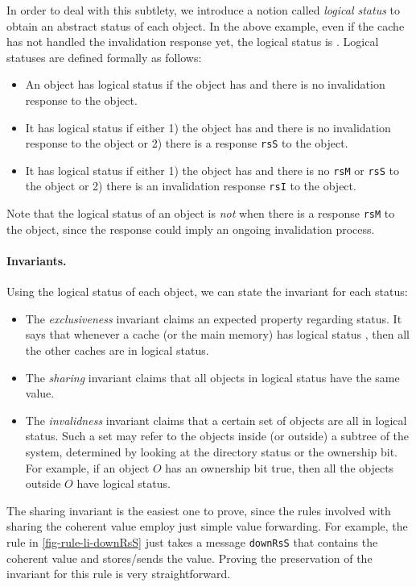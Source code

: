 \documentclass[sigplan,10pt,review,anonymous,screen]{acmart}\settopmatter{printfolios=true,printccs=false,printacmref=false}
\def\slstinline{\lstinline[basicstyle=\ttfamily\small]}
\begin{document}
In order to deal with this subtlety, we introduce a notion called \emph{logical status} to obtain an abstract status of each object.
In the above example, even if the cache has not handled the invalidation response yet, the logical status is \stI{}.
Logical statuses are defined formally as follows:
\begin{itemize}
\item An object has logical status \stM{} if the object has \stM{} and there is no invalidation response to the object.
\item It has logical status \stS{} if either 1) the object has \stS{} and there is no invalidation response to the object or 2) there is a response \slstinline{rsS} to the object.
\item It has logical status \stI{} if either 1) the object has \stI{} and there is no \slstinline{rsM} or \slstinline{rsS} to the object or 2) there is an invalidation response \slstinline{rsI} to the object.
\end{itemize}
Note that the logical status of an object is \emph{not} \stM{} when there is a response \slstinline{rsM} to the object, since the response could imply an ongoing invalidation process.

\paragraph{Invariants.}
Using the logical status of each object, we can state the invariant for each status:
\begin{itemize}
\item The \emph{exclusiveness} invariant claims an expected property regarding \stM{} status. It says that whenever a cache (or the main memory) has logical status \stM{}, then all the other caches are in logical \stI{} status.
\item The \emph{sharing} invariant claims that all objects in logical \stS{} status have the same value.
\item {} The \emph{invalidness} invariant claims that a certain set of objects are all in logical \stI{} status. Such a set may refer to the objects inside (or outside) a subtree of the system, determined by looking at the directory status or the ownership bit. For example, if an object $O$ has an ownership bit true, then all the objects outside $O$ have logical \stI{} status.
\end{itemize}

The sharing invariant is the easiest one to prove, since the rules involved with sharing the coherent value employ just simple value forwarding.
For example, the rule in \autoref{fig-rule-li-downRsS} just takes a message \slstinline{downRsS} that contains the coherent value and stores/sends the value.
Proving the preservation of the invariant for this rule is very straightforward.
\end{document}
